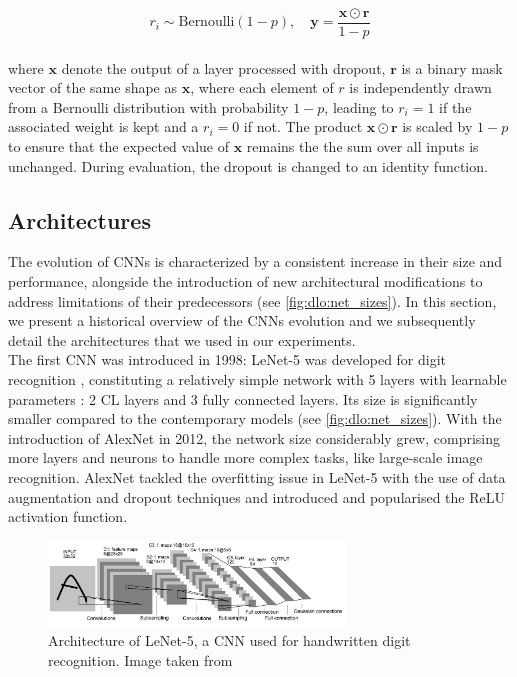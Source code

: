 \begin{equation}
  \label{eqn:dlo:dropout}
    r_i \sim \text{Bernoulli}(1 - p), \quad
    \mathbf{y} = \frac{\mathbf{x} \odot \mathbf{r}}{1 - p} 
\end{equation}\\

\noindent where $\mathbf{x}$ denote the output of a layer processed with
dropout, $\mathbf{r}$ is a binary mask vector of the same shape as $\mathbf{x}$, where
each element of $r$ is independently drawn from a Bernoulli distribution with
probability $1-p$, leading to $r_i=1$ if the associated weight is kept and a
$r_i=0$ if not. The product $\mathbf{x} \odot \mathbf{r}$ is scaled by $1-p$ to
ensure that the expected value of $\mathbf{x}$ remains the the sum over all
inputs is unchanged. During evaluation, the dropout is changed to an identity
function.

\subsection{Architectures}\label{sec:dlo:architectures}


The evolution of \aclp{CNN} is characterized by a consistent increase in
their size and performance, alongside the introduction of new architectural
modifications to address limitations of their predecessors (see
\cref{fig:dlo:net_sizes}). In this section, we present a historical overview of
the \acp{CNN} evolution and we subsequently detail the architectures that we
used in our experiments.\\

The first \ac{CNN} was introduced in 1998: LeNet-5 was developed for digit
recognition \cite{DBLP:journals/pieee/LeCunBBH98}, constituting a relatively
simple network with 5 layers with learnable parameters : 2 \ac{CL} layers
and 3 fully connected layers. Its size is significantly smaller compared to the
contemporary models (see \cref{fig:dlo:net_sizes}). With the introduction of
AlexNet \cite{DBLP:conf/nips/KrizhevskySH12} in 2012, the network size
considerably grew, comprising more layers and neurons to handle more complex
tasks, like large-scale image recognition. AlexNet tackled the overfitting issue
in LeNet-5 with the use of data augmentation and dropout techniques and
introduced and popularised the \ac{ReLU} activation function.\\

\begin{figure}[htbp]
  \centering
  \includegraphics[width=0.70\textwidth]{chapter_sota/assets/lenet.png}
  \caption{Architecture of LeNet-5, a \acl{CNN} used for handwritten digit
    recognition. Image taken from \cite{DBLP:journals/pieee/LeCunBBH98}}
  \label{fig:dlo:lenet5}
\end{figure}


